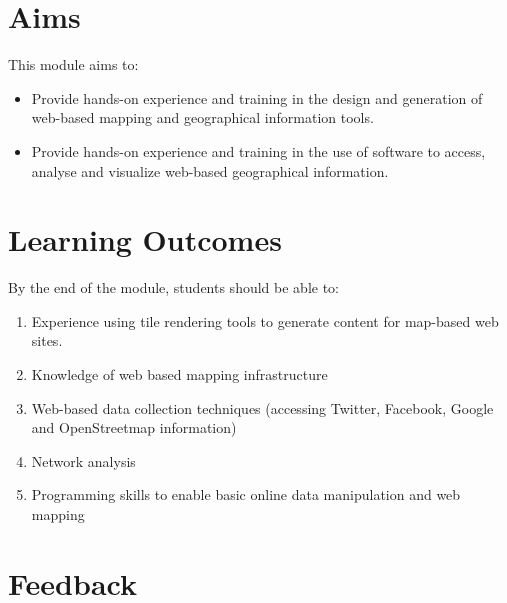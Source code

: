 \documentclass[
  letterpaper,
  DIV=11,
  numbers=noendperiod]{scrreprt}
\providecommand{\tightlist}{%
  \setlength{\itemsep}{0pt}\setlength{\parskip}{0pt}}\usepackage{longtable,booktabs,array}
\begin{document}

\hypertarget{aims}{%
\section*{Aims}\label{aims}}


This module aims to:

\begin{itemize}
\tightlist
\item
  Provide hands-on experience and training in the design and generation
  of web-based mapping and geographical information tools.
\item
  Provide hands-on experience and training in the use of software to
  access, analyse and visualize web-based geographical information.
\end{itemize}

\hypertarget{learning-outcomes}{%
\section*{Learning Outcomes}\label{learning-outcomes}}


By the end of the module, students should be able to:

\begin{enumerate}
\def\labelenumi{(\arabic{enumi})}
\item
  Experience using tile rendering tools to generate content for
  map-based web sites.
\item
  Knowledge of web based mapping infrastructure
\item
  Web-based data collection techniques (accessing Twitter, Facebook,
  Google and OpenStreetmap information)
\item
  Network analysis
\item
  Programming skills to enable basic online data manipulation and web
  mapping
\end{enumerate}

\hypertarget{feedback}{%
\section*{Feedback}\label{feedback}}

\end{document}
